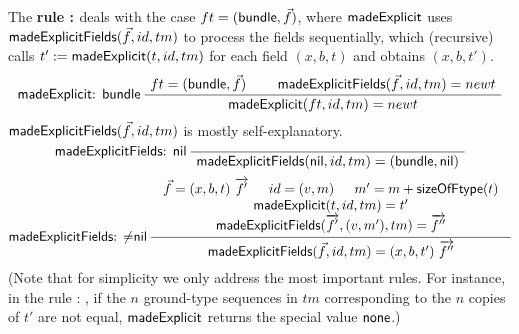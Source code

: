 The \textbf{rule {\madeexplicit: \btype}} deals with the case $ft = ({\sf bundle}, \vec{f})$, where ${\sf madeExplicit}$ %
uses ${\sf madeExplicitFields}(\vec{f}, id, tm)$ %
to process the fields sequentially, which (recursive) calls $t':={\sf madeExplicit}(t, id, tm)$ for each field $(x,b,t)$ %
and obtains $(x,b,t')$.
\[
 \inferii[\madeexplicit: \btype]
  {\seqq{\madeexplicit(ft, id, tm) = newt}}
  {
  	\seqq{ft = (\btype, \vec{f})}
  }
  {
  	\seqq{\madeexplicitfields(\vec{f}, id, tm) = newt}
  }
\]
${\sf madeExplicitFields}(\vec{f}, id, tm)$ is mostly self-explanatory.
%
\[
\infernone[\madeexplicitfields: \nil]
{\seqq{\madeexplicitfields(\nil, id, tm) =  (\btype, \nil)}}
\]
%
\[ 
\infer[\madeexplicitfields: $\neq$\nil]
{\seqq{\madeexplicitfields(\vec{f}, id, tm) = (x, b, t')\ \myvec{f''}}}
{
\begin{array}{c}
\vec{f} = (x, b, t)\ \myvec{f'}\hspace{15pt} id = (v, m) \hspace{15pt} m' = m+\sizeofftype(t) \\
\madeexplicit(t, id, tm) = t' \\
\madeexplicitfields(\myvec{f'}, (v, m'), tm) = \myvec{f''}
\end{array}
}
\]
%
%
(Note that for simplicity %
we only address the most important rules. %
For instance, in the rule {\madeexplicit: \vtype}, if the $n$ ground-type sequences in $tm$ corresponding to the $n$ copies of $t'$ are not equal, ${\sf madeExplicit}$ returns the special value ${\sf none}$.)

